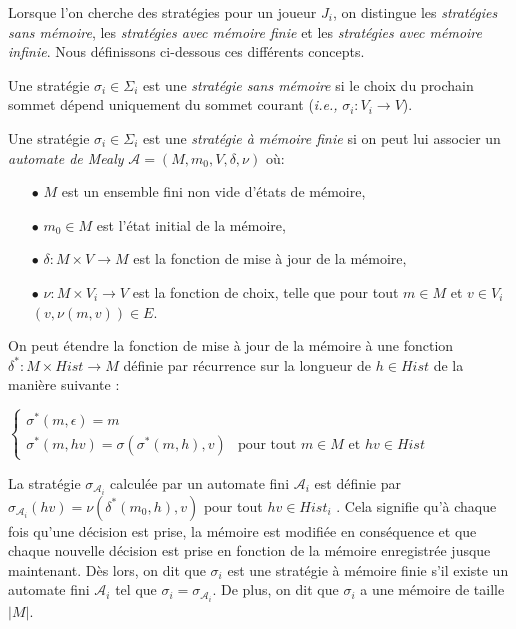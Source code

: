 Lorsque l'on cherche des stratégies pour un joueur $J_{i}$, on distingue les \textit{stratégies sans mémoire}, les \textit{stratégies avec mémoire finie} et les \textit{stratégies avec mémoire infinie}. Nous définissons ci-dessous ces différents concepts.

\begin{defi}
	
	Une stratégie $\sigma _{i} \in \Sigma _{i}$ est une \textit{stratégie sans mémoire} si le choix du prochain sommet dépend uniquement du sommet courant (\emph{i.e.,} $\sigma _{i}: V_{i} \rightarrow V$).
\end{defi}

\begin{defi}
	
	Une stratégie $\sigma _{i} \in \Sigma _{i}$ est une \textit{stratégie à mémoire finie} si on peut lui associer un \textit{automate de Mealy} \linebreak$\mathcal{A} = (M, m_{0}, V, \delta, \nu)$ où:
	\begin{enumerate}
		\item[$\bullet$] $M$ est un ensemble fini non vide d'états de mémoire,
		\item[$\bullet$] $m_{0} \in M$ est l'état initial de la mémoire,
		\item[$\bullet$] $\delta : M \times V \rightarrow M$ est la fonction de mise à jour de la mémoire,
		\item[$\bullet$] $ \nu: M \times V_{i} \rightarrow V$ est la fonction de choix, telle que pour tout $m \in M$ et $v\in V_{i}$ $(v, \nu(m,v))\in E$.\end{enumerate}
		
		On peut étendre la fonction de mise à jour de la mémoire à une fonction $\delta ^{*}: M \times Hist \rightarrow M$ définie par récurrence sur la longueur de $h \in Hist$ de la manière suivante :\\\begin{center}
		 $\begin{cases}
																	\sigma^{*}(m,\epsilon) = m	\\
																	\sigma^{*}(m,hv)=\sigma(\sigma^{*}(m,h),v) & \text{pour tout } m\in M \text{ et } hv\in Hist
																	\end{cases}$ \end{center}
																	
		La stratégie $\sigma _{\mathcal{A}_{i}}$ calculée par un automate fini $\mathcal{A}_{i}$ est définie  par\\
 $\sigma _{\mathcal{A}_{i}}(hv) = \nu(\delta^{*}(m_{0},h),v)$ pour tout $hv \in Hist_{i}$ . Cela signifie qu'à chaque fois qu'une décision est prise, la mémoire est modifiée en conséquence et que chaque nouvelle décision est prise en fonction de la mémoire enregistrée jusque maintenant.
		Dès lors, on dit que $\sigma _{i}$ est une stratégie à mémoire finie s'il existe un automate fini $\mathcal{A}_{i}$ tel que $\sigma _{i} = \sigma _{\mathcal{A}_{i}}$. De plus, on dit que $\sigma_i$ a une mémoire de taille $|M|$.

\end{defi}

